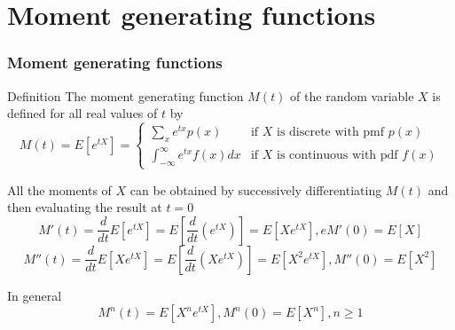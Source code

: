 \documentclass[slidestop,compress,mathserif]{beamer}
\begin{document}
%
%
%
%








\section{Moment generating functions}

\begin{frame}\frametitle{Moment generating functions}
\begin{block}{Definition}
The moment generating function $M(t)$ of the random variable $X$ is defined for all real values of $t$ by
\[ M(t) = E[e^{tX}] = \begin{cases}
    \sum_x e^{tx}p(x) & \text{if $X$ is discrete with pmf $p(x)$} \\
    \int_{-\infty}^{\infty}e^{tx}f(x)dx        & \text{if $X$ is continuous with pdf $f(x)$}
\end{cases}
 \]
\end{block}

{\small{
All the moments of $X$ can be obtained by successively differentiating $M(t)$ and then evaluating the result at $t = 0$
$$M'(t) = \frac{d}{dt}E[e^{tX}] = E[\frac{d}{dt}(e^{tX})] = E[Xe^{tX}], e M'(0) = E[X]$$
$$M''(t) = \frac{d}{dt}E[Xe^{tX}] = E[\frac{d}{dt}(Xe^{tX})] = E[X^2e^{tX}],M''(0) = E[X^2]$$

In general
$$M^n(t) = E[X^ne^{tX}], M^n(0) = E[X^n], n \geq 1$$
}}
\end{frame}
\end{document}
